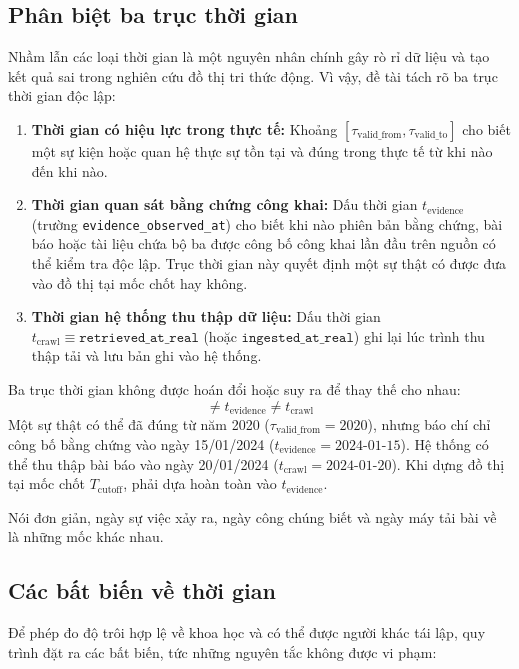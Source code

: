 \subsection{Phân biệt ba trục thời gian}
Nhầm lẫn các loại thời gian là một nguyên nhân chính gây rò rỉ dữ liệu và tạo kết quả sai trong nghiên cứu đồ thị tri thức động. Vì vậy, đề tài tách rõ ba trục thời gian độc lập:

\begin{enumerate}
    \item \textbf{Thời gian có hiệu lực trong thực tế:}
    Khoảng $[\tau_{\text{valid\_from}}, \tau_{\text{valid\_to}}]$ cho biết một sự kiện hoặc quan hệ thực sự tồn tại và đúng trong thực tế từ khi nào đến khi nào.
    \item \textbf{Thời gian quan sát bằng chứng công khai:}
    Dấu thời gian $t_{\text{evidence}}$ (trường \texttt{evidence\_\allowbreak observed\_\allowbreak at}) cho biết khi nào phiên bản bằng chứng, bài báo hoặc tài liệu chứa bộ ba được công bố công khai lần đầu trên nguồn có thể kiểm tra độc lập. Trục thời gian này quyết định một sự thật có được đưa vào đồ thị tại mốc chốt hay không.
    \item \textbf{Thời gian hệ thống thu thập dữ liệu:}
    Dấu thời gian $t_{\text{crawl}} \equiv \texttt{retrieved\_at\_real}$ (hoặc $\texttt{ingested\_at\_real}$) ghi lại lúc trình thu thập tải và lưu bản ghi vào hệ thống.
\end{enumerate}

\begin{definition}
Ba trục thời gian không được hoán đổi hoặc suy ra để thay thế cho nhau:
\begin{equation}
[\tau_{\text{valid\_from}}, \tau_{\text{valid\_to}}] \neq t_{\text{evidence}} \neq t_{\text{crawl}}
\end{equation}
Một sự thật có thể đã đúng từ năm 2020 ($\tau_{\text{valid\_from}} = 2020$), nhưng báo chí chỉ công bố bằng chứng vào ngày 15/01/2024 ($t_{\text{evidence}} = \text{2024-01-15}$). Hệ thống có thể thu thập bài báo vào ngày 20/01/2024 ($t_{\text{crawl}} = \text{2024-01-20}$). Khi dựng đồ thị tại mốc chốt $T_{\text{cutoff}}$, phải dựa hoàn toàn vào $t_{\text{evidence}}$.
\end{definition}
Nói đơn giản, ngày sự việc xảy ra, ngày công chúng biết và ngày máy tải bài về là những mốc khác nhau.
\subsection{Các bất biến về thời gian}
Để phép đo độ trôi hợp lệ về khoa học và có thể được người khác tái lập, quy trình đặt ra các bất biến, tức những nguyên tắc không được vi phạm:

